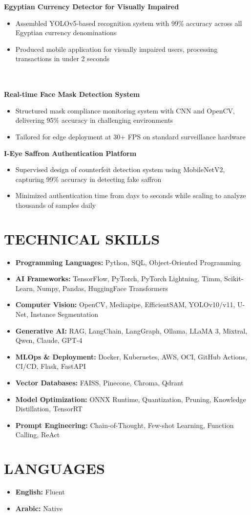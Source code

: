 \documentclass[11pt]{article}
\begin{document}
\textbf{Egyptian Currency Detector for Visually Impaired}
\begin{itemize}
\item Assembled YOLOv5-based recognition system with 99\% accuracy across all Egyptian currency denominations
\item Produced mobile application for visually impaired users, processing transactions in under 2 seconds
\end{itemize}
\hfill\hfill \\
\hfill\hfill \\
\textbf{Real-time Face Mask Detection System}
\begin{itemize}
\item Structured mask compliance monitoring system with CNN and OpenCV, delivering 95\% accuracy in challenging environments
\item Tailored for edge deployment at 30+ FPS on standard surveillance hardware
\end{itemize}

\textbf{I-Eye Saffron Authentication Platform}
\begin{itemize}
\item Supervised design of counterfeit detection system using MobileNetV2, capturing 99\% accuracy in detecting fake saffron
\item Minimized authentication time from days to seconds while scaling to analyze thousands of samples daily
\end{itemize}

\section{TECHNICAL SKILLS}

\begin{itemize}
\item \textbf{Programming Languages:} Python, SQL, Object-Oriented Programming
\item \textbf{AI Frameworks:} TensorFlow, PyTorch, PyTorch Lightning, Timm, Scikit-Learn, Numpy, Pandas, HuggingFace Transformers
\item \textbf{Computer Vision:} OpenCV, Mediapipe, EfficientSAM, YOLOv10/v11, U-Net, Instance Segmentation
\item \textbf{Generative AI:} RAG, LangChain, LangGraph, Ollama, LLaMA 3, Mixtral, Qwen, Claude, GPT-4
\item \textbf{MLOps \& Deployment:} Docker, Kubernetes, AWS, OCI, GitHub Actions, CI/CD, Flask, FastAPI
\item \textbf{Vector Databases:} FAISS, Pinecone, Chroma, Qdrant
\item \textbf{Model Optimization:} ONNX Runtime, Quantization, Pruning, Knowledge Distillation, TensorRT
\item \textbf{Prompt Engineering:} Chain-of-Thought, Few-shot Learning, Function Calling, ReAct
\end{itemize}

\section{LANGUAGES}

\begin{itemize}
\item \textbf{English:} Fluent
\item \textbf{Arabic:} Native
\end{itemize}
\end{document}
